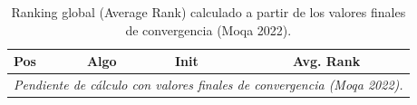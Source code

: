 
\begin{table}[H]
    \centering
    \begin{tabular}{lllc}
        \toprule
        Pos & Algo & Init & Avg. Rank \\
        \midrule
        \multicolumn{4}{c}{\textit{Pendiente de cálculo con valores finales de convergencia (Moqa 2022).}} \\
        \bottomrule
    \end{tabular}
    \caption{Ranking global (Average Rank) calculado a partir de los valores finales de convergencia (Moqa 2022).}
    \label{tab:moqa_average_rank_finales}
\end{table}
